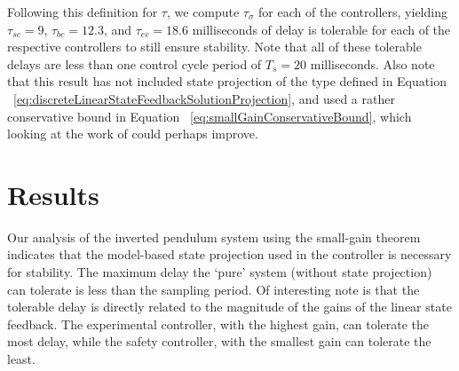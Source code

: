 \documentclass[conference]{IEEEtran}
\begin{document}
Following this definition for $\tau$, we compute $\tau_{\sigma}$ for each of the controllers, yielding $\tau_{sc}=9$, $\tau_{bc}=12.3$, and $\tau_{ec}=18.6$ milliseconds of delay is tolerable for each of the respective controllers to still ensure stability.  Note that all of these tolerable delays are less than one control cycle period of $T_s=20$ milliseconds.  Also note that this result has not included state projection of the type defined in Equation ~\ref{eq:discreteLinearStateFeedbackSolutionProjection}, and used a rather conservative bound in Equation ~\ref{eq:smallGainConservativeBound}, which looking at the work of \cite{Fridman2008} could perhaps improve.

\section{Results}
Our analysis of the inverted pendulum system using the small-gain theorem indicates that the model-based state projection used in the controller is necessary for stability.  The maximum delay the `pure' system (without state projection) can tolerate is less than the sampling period.  Of interesting note is that the tolerable delay is directly related to the magnitude of the gains of the linear state feedback.  The experimental controller, with the highest gain, can tolerate the most delay, while the safety controller, with the smallest gain can tolerate the least.

%
%
\end{document}
